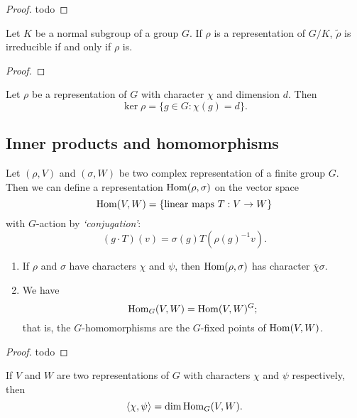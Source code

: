\begin{proof}
    todo
\end{proof}

\begin{corollary}
    Let $K$ be a normal subgroup of a group $G$. If $\rho$ is a representation of $G/K$, $\tilde\rho$ is irreducible if and only if $\rho$ is.
\end{corollary}

\begin{proof}
\end{proof}

\begin{proposition}
    Let $\rho$ be a representation of $G$ with character $\chi$ and dimension $d$. Then
    \[ \ker\rho = \{g \in G: \chi(g) = d\}. \]
\end{proposition}

\subsection{Inner products and homomorphisms}

Let $(\rho, V)$ and $(\sigma, W)$ be two complex representation of a finite group $G$. Then we can define a representation $\operatorname{Hom}(\rho, \sigma)$ on the vector space
\[ \operatorname{Hom}(V, W) = \{\text{linear maps $T: V \to W$}\} \]
with $G$-action by \emph{`conjugation'}:
\[ (g \cdot T)(v) = \sigma(g) T(\rho(g)^{-1}v). \]

\begin{lemma}
    \hspace{0em}
    \begin{enumerate}
        \item If $\rho$ and $\sigma$ have characters $\chi$ and $\psi$, then $\operatorname{Hom}(\rho, \sigma)$ has character $\overline\chi\sigma$.
        \item We have
              \[ \operatorname{Hom}_G(V, W) = \operatorname{Hom}(V,W)^G; \]
              that is, the $G$-homomorphisms are the $G$-fixed points of $\operatorname{Hom}(V,W)$.
    \end{enumerate}
\end{lemma}

\begin{proof}
    todo
\end{proof}

\begin{theorem}
    If $V$ and $W$ are two representations of $G$ with characters $\chi$ and $\psi$ respectively, then
    \[ \langle \chi, \psi \rangle = \dim\operatorname{Hom}_G(V, W). \]
\end{theorem}

